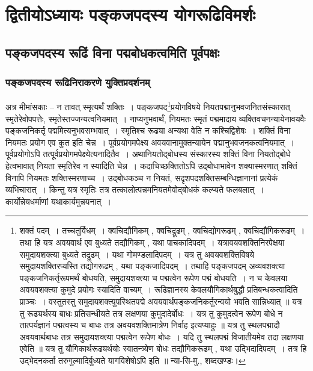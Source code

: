 \chapter{द्वितीयोऽध्यायः पङ्कजपदस्य योगरूढिविमर्शः}

	\section{पङ्कजपदस्य रूढिं विना पद्मबोधकत्वमिति पूर्वपक्षः}

		\subsection{पङ्कजपदस्य रूढिनिराकरणे युक्तिप्रदर्शनम्} 

			\begin{small}
				
				अत्र मीमांसकाः – न तावत् स्मृत्यर्थं शक्तिः~। पङ्कजपद\footnote{शक्तं पदम्~। तच्चतुर्विधम्~। क्वचिद्यौगिकम् , क्वचिद्रूढम् , क्वचिद्योगरूढम् , क्वचिद्यौगिकरूढम्~। तथा हि यत्र अवयवार्थ एव बुध्यते तद्यौगिकम् , यथा पाचकादिपदम्~। यत्रावयवशक्तिनिरपेक्षया समुदायशक्त्या बुध्यते तद्रूढम्~। यथा गोमण्डलादिपदम्~।  यत्र तु अवयवशक्तिविषये समुदायशक्तिरप्यस्ति तद्योगरूढम् , यथा पङ्कजादिपदम्~। तथाहि पङ्कजपदम् अव्यवशक्त्या पङ्कजनिकर्तृरूपमर्थं बोधयति, समुदायशक्त्या च पद्मत्वेन रूपेण पद्मं बोधयति~। न च केवलया अवयवशक्त्या कुमुदे प्रयोगः स्यादिति वाच्यम्~। रूढिज्ञानस्य केवलयौगिकार्थबुद्धौ  प्रतिबन्धकत्वादिति प्राञ्चः~। वस्तुतस्तु समुदायशक्त्युपस्थितपद्मे अवयवार्थपङ्कजनिकर्तुरन्वयो भवति सान्निध्यात् ॥ यत्र तु रूढ्यर्थस्य बाधः प्रतिसन्धीयते तत्र लक्षणया कुमुदादेर्बोधः~। यत्र तु कुमुदत्वेन  रूपेण बोधे न तात्पर्यज्ञानं पद्मत्वस्य च बाधः तत्र अवयवशक्तिमात्रेण निर्वाह इत्यप्याहुः ॥ यत्र तु स्थलपद्मादौ अवयवार्थबाधः तत्र समुदायशक्त्या पद्मत्वेन रूपेण बोधः~। यदि तु स्थलपद्मं विजातीयमेव तदा लक्षणया एवेति ॥ यत्र तु यौगिकार्थरूढ्यर्थयोः स्वातन्त्र्येण बोधः तद्यौगिकरूढम् , यथा उद्भिदादिपदम्~। तत्र हि उद्भेदनकर्ता तरुगुल्मादिर्बुध्यते यागविशेषोऽपि इति ॥ न्या-सि-मु., शब्दखण्डः।}प्रयोगविषये नियतपद्मानुभवजनितसंस्कारात् स्मृतेरेवोपपत्तेः, स्मृतेस्तज्जन्यत्वनियमात्~। नाप्यनुभवार्थं, नियमतः स्मृतं पद्ममादाय व्यक्तिवचनन्यायेनावयवैः पङ्कजनिकर्तृ पद्ममित्यनुभवसम्भवात्~। स्मृतिश्च रूढ्या अन्यथा वेति न कश्चिद्विशेषः~। शक्तिं विना नियमतः प्रयोग एव कुत इति चेन्न~। पूर्वप्रयोगमपेक्ष्य अवयवानामुक्तन्यायेन पद्मानुभवजनकत्वनियमात्~। पूर्वप्रयोगोऽपि तत्पूर्वप्रयोगमपेक्ष्येत्यनादितैव~। अथानियतोद्बोधस्य संस्कारस्य शक्तिं विना नियतोद्बोधे हेत्वभावात् नियता स्मृतिरेव न स्यादिति चेन्न~। कदाचिच्छक्तितोऽपि उद्बोधाभावेन शक्यास्मरणात् शक्तिं विनापि नियमतः शक्तिस्मरणाच्च~। उद्बोधकञ्च न नियतं, सदृशपदशक्तिसम्बन्धिज्ञानानां प्रत्येकं व्यभिचारात्~। किन्तु यत्र स्मृतिः तत्र तत्कालोत्पन्नमनियतमेवोद्बोधकं कल्प्यते फलबलात्~। कार्योन्नेयधर्माणां यथाकार्यमुन्नयनात्~। 
			\end{small}

